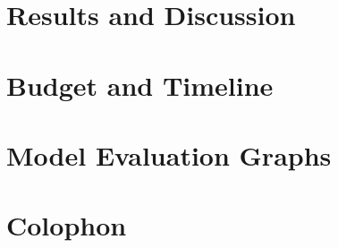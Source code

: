 %	

\chapter{Results and Discussion}
	\Mprintcontents
	\label{ch:results}
	
	\stopcontents[chapters]
	\clearpage


\printbibliography

\clearpage

\appendix
\chapter{Budget and Timeline}
	
	
\chapter{Model Evaluation Graphs}


\backmatter
\chapter{Colophon}
	



